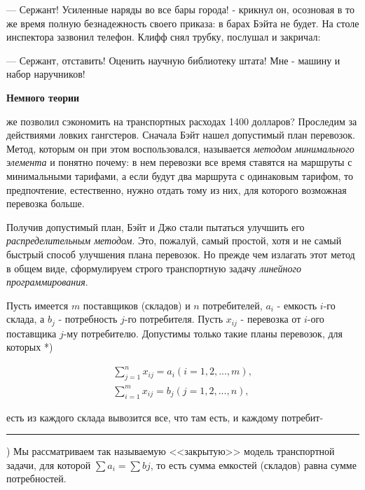 \documentclass[main.tex]{subfiles}
\begin{document}
\begin{multicols*}{2}
--- Сержант! Усиленные наряды во все бары города! - крикнул он, осозновая в то же время полную безнадежность своего приказа: в барах Бэйта не будет. На столе инспектора зазвонил телефон. Клифф снял трубку, послушал и закричал:

--- Сержант, отставить! Оценить научную библиотеку штата! Мне - машину и набор наручников!

\medskip

\noindent\textbf{Немного теории}

 же позволил сэкономить на транспортных расходах 1400 долларов? Проследим за действиями ловких гангстеров. Сначала Бэйт нашел допустимый план перевозок. Метод, которым он при этом воспользовался, называется \textit{методом минимального элемента} и понятно почему: в нем перевозки все время ставятся на маршруты с минимальными тарифами, а если будут два маршрута с одинаковым тарифом, то предпочтение, естественно, нужно отдать тому из них, для которого возможная перевозка больше.

Получив допустимый план, Бэйт и Джо стали пытаться улучшить его \textit{распределительным методом}. Это, пожалуй, самый простой, хотя и не самый быстрый способ улучшения плана перевозок. Но прежде чем излагать этот метод в общем виде, сформулируем строго транспортную задачу \textit{линейного программирования}.

Пусть имеется $m$ поставщиков (складов) и $n$ потребителей, $a_{i}$ - емкость $i$-го склада, а $b_{j}$ - потребность $j$-го потребителя. Пусть $x_{ij}$ - перевозка от $i$-ого поставщика $j$-му потребителю. Допустимы только такие планы перевозок, для которых *)

\setlength{\abovedisplayskip}{0pt}
\setlength{\belowdisplayskip}{0pt}
\noindent\begin{equation}
\begin{split}
\sum_{j=1}^{n} x_{ij} = a_{i}  (i=1,2,...,m), \\
\sum_{i=1}^{m} x_{ij} = b_{j}  (j=1,2,...,n),
\end{split}
\end{equation}

 есть из каждого склада вывозится все, что там есть, и каждому потребит-

\noindent\rule{0.49\textwidth}{0.1em}

{\fontsize{0.7em}{0.84em}\selectfont*) Мы рассматриваем так называемую <<закрытую>> модель транспортной задачи, для которой $\sum a_{i} = \sum b{j}$, то есть сумма емкостей (складов) равна сумме потребностей.}

\end{multicols*}
\newpage
\end{document}
